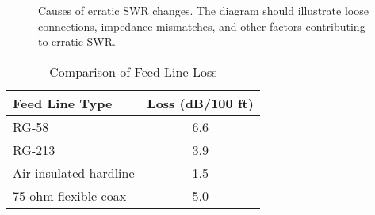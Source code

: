 \begin{figure}[h!]
    \centering
    \caption{Causes of erratic SWR changes. The diagram should illustrate loose connections, impedance mismatches, and other factors contributing to erratic SWR.}
    \label{fig:erratic_swr}
\end{figure}

\begin{table}[h!]
    \centering
    \begin{tabular}{|l|c|}
        \hline
        \textbf{Feed Line Type} & \textbf{Loss (dB/100 ft)} \\
        \hline
        RG-58 & 6.6 \\
        RG-213 & 3.9 \\
        Air-insulated hardline & 1.5 \\
        75-ohm flexible coax & 5.0 \\
        \hline
    \end{tabular}
    \caption{Comparison of Feed Line Loss}
    \label{tab:feed_line_loss}
\end{table}
